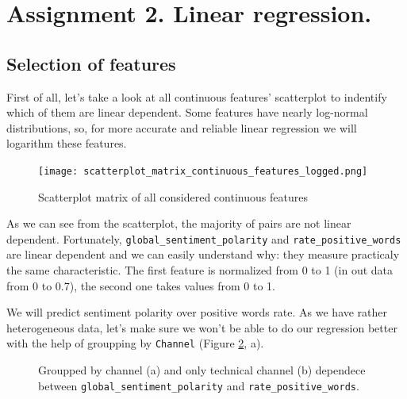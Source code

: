 \section{Assignment 2. Linear regression.}

\subsection{Selection of features}

First of all, let's take a look at all continuous features' scatterplot to indentify which of them are linear dependent. 
Some features have nearly log-normal distributions, so, for more accurate and reliable linear regression we will logarithm these features.

\begin{figure}[h!]
 \begin{center}
    \center \texttt{[image: scatterplot\_matrix\_continuous\_features\_logged.png]}
   \caption{Scatterplot matrix of all considered continuous features}
   \label{img:scatterplot_matrix_continuous_features_logged}
 \end{center}
\end{figure} 

As we can see from the scatterplot, the majority of pairs are not linear dependent. Fortunately, \texttt{global\_sentiment\_polarity} and \texttt{rate\_positive\_words} are linear dependent and we can easily understand why: they measure practicaly the same characteristic. The first feature is normalized from 0 to 1 (in out data from 0 to 0.7), the second one takes values from 0 to 1.

We will predict sentiment polarity over positive words rate. As we have rather heterogeneous data, let's make sure we won't be able to do our regression better with the help of groupping by \texttt{Channel} (Figure \ref{img:scatterplot_ratepositive_polarity}, a).

\begin{figure}[h]
\begin{minipage}[h]{0.49\linewidth}
\end{minipage}
\hfill
\begin{minipage}[h]{0.49\linewidth}
\end{minipage}
\caption{Groupped by channel (a) and only technical channel (b) dependece between \texttt{global\_sentiment\_polarity} and \texttt{rate\_positive\_words}.}
\label{img:scatterplot_ratepositive_polarity}
\end{figure}

